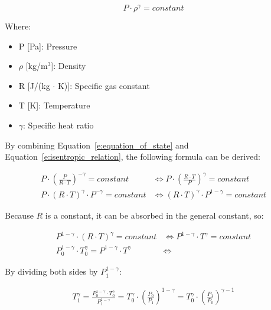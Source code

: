 \documentclass[../main]{subfiles}
\begin{document}
\vspace{0mm}
\begin{equation}
P \cdot \rho^\gamma = constant
\label{e:isentropic_relation}
\end{equation}
\vspace{0mm}

\vspace{0mm}
\begin{minipage}{\linewidth}
Where:
\begin{itemize}
    \item[] P [Pa]: Pressure
    \item[] $\rho$ [kg/m$^3$]: Density
    \item[] R [J/(kg $\cdot$ K)]: Specific gas constant
    \item[] T [K]: Temperature
    \item[] $\gamma$: Specific heat ratio
\end{itemize}
\end{minipage}
\vspace{2mm}

By combining Equation~\ref{e:equation_of_state} and Equation~\ref{e:isentropic_relation}, the following formula can be derived:

\vspace{0mm}
\begin{align*}
P \cdot \left(\frac{P}{R \cdot T}\right)^{-\gamma} = constant
&\Leftrightarrow
P \cdot \left(\frac{R \cdot T}{P}\right)^{\gamma} = constant \\
P \cdot (R \cdot T)^{\gamma} \cdot P^{-\gamma} = constant
&\Leftrightarrow
(R \cdot T)^{\gamma} \cdot P^{1-\gamma} = constant 
\label{}
\end{align*}
\vspace{0mm}

Because $R$ is a constant, it can be absorbed in the general constant, so:

\vspace{0mm}
\begin{align*}
P^{1-\gamma} \cdot (R \cdot T)^{\gamma} = constant
&\Leftrightarrow
P^{1-\gamma} \cdot T^{\gamma} = constant \\
P_0^{1-\gamma} \cdot T_0^{\gamma} = P^{1-\gamma} \cdot T^{\gamma}
&\Leftrightarrow
\label{}
\end{align*}
\vspace{0mm}

By dividing both sides by $P_1^{1-\gamma}$:

\vspace{0mm}
\begin{align*}
T_1^{\gamma} = \frac{P_0^{1-\gamma} \cdot T_0^{\gamma}}{P_1^{1-\gamma}}
= T_0^{\gamma} \cdot \left(\frac{P_0}{P_1}\right)^{1-\gamma}
= T_0^{\gamma} \cdot \left(\frac{P_1}{P_0}\right)^{\gamma-1}
\end{align*}
\vspace{0mm}
\end{document}
